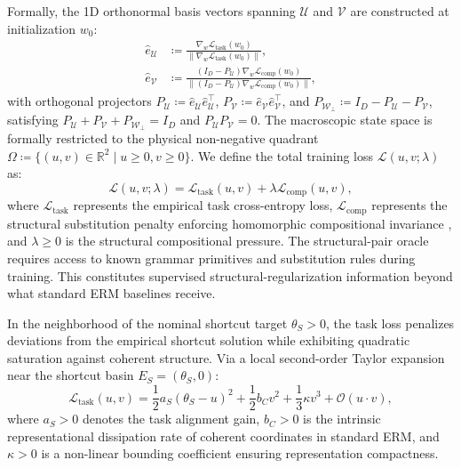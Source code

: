 \documentclass{article}
\theoremstyle{plain}
\theoremstyle{definition}
\begin{document}
Formally, the 1D orthonormal basis vectors spanning $\mathcal{U}$ and $\mathcal{V}$ are constructed at initialization $w_0$:
\begin{align}
    \hat{e}_{\mathcal{U}} &\coloneqq \frac{\nabla_w \mathcal{L}_{\text{task}}(w_0)}{\|\nabla_w \mathcal{L}_{\text{task}}(w_0)\|}, \label{eq:e_u_def} \\
    \hat{e}_{\mathcal{V}} &\coloneqq \frac{(I_D - P_{\mathcal{U}}) \nabla_w \mathcal{L}_{\text{comp}}(w_0)}{\|(I_D - P_{\mathcal{U}}) \nabla_w \mathcal{L}_{\text{comp}}(w_0)\|}, \label{eq:e_v_def}
\end{align}
with orthogonal projectors $P_{\mathcal{U}} \coloneqq \hat{e}_{\mathcal{U}} \hat{e}_{\mathcal{U}}^\top$, $P_{\mathcal{V}} \coloneqq \hat{e}_{\mathcal{V}} \hat{e}_{\mathcal{V}}^\top$, and $P_{\mathcal{W}_\perp} \coloneqq I_D - P_{\mathcal{U}} - P_{\mathcal{V}}$, satisfying $P_{\mathcal{U}} + P_{\mathcal{V}} + P_{\mathcal{W}_\perp} = I_D$ and $P_{\mathcal{U}} P_{\mathcal{V}} = 0$. The macroscopic state space is formally restricted to the physical non-negative quadrant $\Omega \coloneqq \{ (u, v) \in \mathbb{R}^2 \mid u \ge 0, v \ge 0 \}$.
We define the total training loss $\mathcal{L}(u, v; \lambda)$ as:
\begin{equation}
    \mathcal{L}(u, v; \lambda) = \mathcal{L}_{\text{task}}(u, v) + \lambda \mathcal{L}_{\text{comp}}(u, v),
    \label{eq:total_loss}
\end{equation}
where $\mathcal{L}_{\text{task}}$ represents the empirical task cross-entropy loss, $\mathcal{L}_{\text{comp}}$ represents the structural substitution penalty enforcing homomorphic compositional invariance \citep{An2026Representational}, and $\lambda \ge 0$ is the structural compositional pressure. The structural-pair oracle requires access to known grammar primitives and substitution rules during training. This constitutes supervised structural-regularization information beyond what standard ERM baselines receive.

In the neighborhood of the nominal shortcut target $\theta_S > 0$, the task loss penalizes deviations from the empirical shortcut solution while exhibiting quadratic saturation against coherent structure. Via a local second-order Taylor expansion near the shortcut basin $E_S = (\theta_S, 0)$:
\begin{equation}
    \mathcal{L}_{\text{task}}(u, v) = \frac{1}{2} a_S (\theta_S - u)^2 + \frac{1}{2} b_C v^2 + \frac{1}{3} \kappa v^3 + \mathcal{O}(u \cdot v),
    \label{eq:task_loss}
\end{equation}
where $a_S > 0$ denotes the task alignment gain, $b_C > 0$ is the intrinsic representational dissipation rate of coherent coordinates in standard ERM, and $\kappa > 0$ is a non-linear bounding coefficient ensuring representation compactness.
\end{document}
